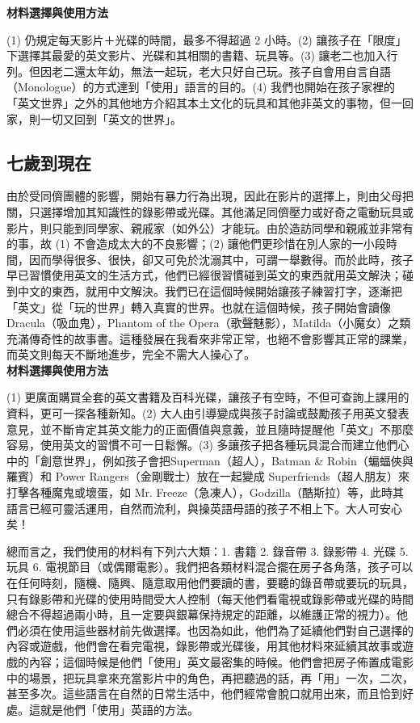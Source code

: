 \textbf{材料選擇與使用方法}

(1) 仍規定每天影片＋光碟的時間，最多不得超過 2 小時。(2) 讓孩子在「限度」下選擇其最愛的英文影片、光碟和其相關的書籍、玩具等。(3) 讓老二也加入行列。但因老二還太年幼，無法一起玩，老大只好自己玩。孩子自會用自言自語（Monologue）的方式達到「使用」語言的目的。(4) 我們也開始在孩子家裡的「英文世界」之外的其他地方介紹其本土文化的玩具和其他非英文的事物，但一回家，則一切又回到「英文的世界」。

\subsection{七歲到現在}
由於受同儕團體的影響，開始有暴力行為出現，因此在影片的選擇上，則由父母把關，只選擇增加其知識性的錄影帶或光碟。其他滿足同儕壓力或好奇之電動玩具或影片，則只能到同學家、親戚家（如外公）才能玩。由於造訪同學和親戚並非常有的事，故 (1) 不會造成太大的不良影響；(2) 讓他們更珍惜在別人家的一小段時間，因而學得很多、很快，卻又可免於沈溺其中，可謂一舉數得。而於此時，孩子早已習慣使用英文的生活方式，他們已經很習慣碰到英文的東西就用英文解決；碰到中文的東西，就用中文解決。我們已在這個時候開始讓孩子練習打字，逐漸把「英文」從「玩的世界」轉入真實的世界。也就在這個時候，孩子開始會讀像 Dracula（吸血鬼），Phantom of the Opera（歌聲魅影），Matilda（小魔女）之類充滿傳奇性的故事書。這種發展在我看來非常正常，也絕不會影響其正常的課業，而英文則每天不斷地進步，完全不需大人操心了。\\

\textbf{材料選擇與使用方法}

(1) 更廣面購買全套的英文書籍及百科光碟，讓孩子有空時，不但可查詢上課用的資料，更可一探各種新知。(2) 大人由引導變成與孩子討論或鼓勵孩子用英文發表意見，並不斷肯定其英文能力的正面價值與意義，並且隨時提醒他「英文」不那麼容易，使用英文的習慣不可一日鬆懈。(3) 多讓孩子把各種玩具混合而建立他們心中的「創意世界」，例如孩子會把Superman（超人），Batman \& Robin（蝙蝠俠與羅賓）和 Power Rangers（金剛戰士）放在一起變成 {\E Superfriends}（超人朋友）來打擊各種魔鬼或壞蛋，如 Mr. Freeze（急凍人），Godzilla（酷斯拉）等，此時其語言已經可靈活運用，自然而流利，與操英語母語的孩子不相上下。大人可安心矣！

總而言之，我們使用的材料有下列六大類：1. 書籍 2. 錄音帶 3. 錄影帶 4. 光碟 5. 玩具 6. 電視節目（或偶爾電影）。我們把各類材料混合擺在房子各角落，孩子可以在任何時刻，隨機、隨興、隨意取用他們要讀的書，要聽的錄音帶或要玩的玩具，只有錄影帶和光碟的使用時間受大人控制（每天他們看電視或錄影帶或光碟的時間總合不得超過兩小時，且一定要與銀幕保持規定的距離，以維護正常的視力）。他們必須在使用這些器材前先做選擇。也因為如此，他們為了延續他們對自己選擇的內容或遊戲，他們會在看完電視，錄影帶或光碟後，用其他材料來延續其故事或遊戲的內容；這個時候是他們「使用」英文最密集的時候。他們會把房子佈置成電影中的場景，把玩具拿來充當影片中的角色，再把聽過的話，再「用」一次，二次，甚至多次。這些語言在自然的日常生活中，他們經常會脫口就用出來，而且恰到好處。這就是他們「使用」英語的方法。

